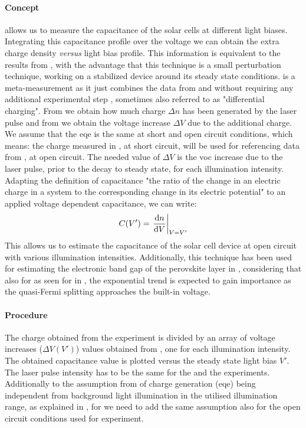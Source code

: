 	\paragraph{Concept}
	 allows us to measure the capacitance of the solar cells at different light biases.
	Integrating this capacitance profile over the voltage we can obtain the extra charge density \textit{versus} light bias profile.
	This information is equivalent to the results from , with the advantage that this technique is a small perturbation technique, working on a stabilized device around its steady state conditions.
	 is a meta-measurement as it just combines the data from  and  without requiring any additional experimental step \cite{ORegan2005,ORegan2006,Shuttle2008,Credgington2014,Maurano2011}, sometimes also referred to as "differential charging".
	From  we obtain how much charge $\Delta n$ has been generated by the laser pulse and from  we obtain the voltage increase $\Delta V$ due to the additional charge.
	We assume that the \gls{eqe} is the same at short and open circuit conditions, which means: the charge measured in , at short circuit, will be used for referencing data from , at open circuit.
The needed value of $\Delta V$ is the \gls{voc} increase due to the laser pulse, prior to the decay to steady state, for each illumination intensity.
	Adapting the definition of capacitance "the ratio of the change in an electric charge in a system to the corresponding change in its electric potential" \cite{WikipediaCapacitance2019} to an applied voltage dependent capacitance, we can write:
	$$C(V') = \eval{\dv{n}{V}}_{V=V'}$$
	This allows us to estimate the capacitance of the solar cell device at open circuit with various illumination intensities.
	Additionally, this technique has been used for estimating the electronic band gap of the perovskite layer in , considering that also for  as seen for  in , the exponential trend is expected to gain importance as the quasi-Fermi splitting approaches the built-in voltage.
	
	\paragraph{Procedure}
		The charge obtained from the  experiment is divided by an array of voltage increases ($\Delta V(V')$) values obtained from , one for each illumination intensity.
		The obtained capacitance value is plotted versus the steady state light bias $V'$.
		The laser pulse intensity has to be the same for the  and the  experiments.
		Additionally to the assumption from  of charge generation (\gls{eqe}) being independent from background light illumination in the utilised illumination range, as explained in , for  we need to add the same assumption also for the open circuit conditions used for  experiment.
	

